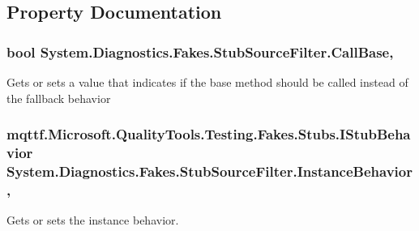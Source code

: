 \subsection{Property Documentation}
\hypertarget{class_system_1_1_diagnostics_1_1_fakes_1_1_stub_source_filter_a55ae900bfa486bf23d7e8f521549a740}{
\subsubsection[{Call\-Base}]{\setlength{\rightskip}{0pt plus 5cm}bool System.\-Diagnostics.\-Fakes.\-Stub\-Source\-Filter.\-Call\-Base\hspace{0.3cm}{\ttfamily [get]}, {\ttfamily [set]}}}\label{class_system_1_1_diagnostics_1_1_fakes_1_1_stub_source_filter_a55ae900bfa486bf23d7e8f521549a740}


Gets or sets a value that indicates if the base method should be called instead of the fallback behavior

\hypertarget{class_system_1_1_diagnostics_1_1_fakes_1_1_stub_source_filter_a0a68cd2d5af247dc8154c51e3c490ef2}{
\subsubsection[{Instance\-Behavior}]{\setlength{\rightskip}{0pt plus 5cm}mqttf.\-Microsoft.\-Quality\-Tools.\-Testing.\-Fakes.\-Stubs.\-I\-Stub\-Behavior System.\-Diagnostics.\-Fakes.\-Stub\-Source\-Filter.\-Instance\-Behavior\hspace{0.3cm}{\ttfamily [get]}, {\ttfamily [set]}}}\label{class_system_1_1_diagnostics_1_1_fakes_1_1_stub_source_filter_a0a68cd2d5af247dc8154c51e3c490ef2}


Gets or sets the instance behavior.

